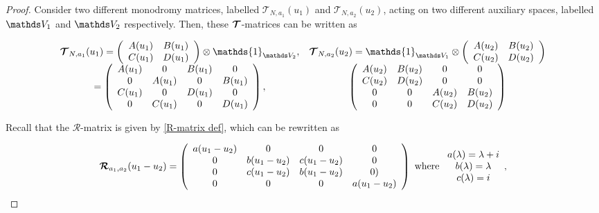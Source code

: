\documentclass{homework}
\begin{document}
\begin{proof}
Consider two different monodromy matrices, labelled $\bm{\mathcal{T}}_{N, a_1} (u_1)$ and  $\bm{\mathcal{T}}_{N, a_2} (u_2)$, acting on two different auxiliary spaces, labelled $\vds_1$ and $\vds_2$ respectively. Then, these $\bm{\mathcal{T}}$-matrices can be written as 

\begin{equation} \begin{array}{cc}
   \bm{\mathcal{T}}_{N, a_1} (u_1) = \left( \begin{array}{cc}
        A(u_1) & B(u_1)  \\
        C(u_1) & D(u_1) 
    \end{array} \right) \otimes \mathds{1}_{\vds_2}, & \bm{\mathcal{T}}_{N, a_2} (u_2) = \mathds{1}_{\vds_1} \otimes \left( \begin{array}{cc}
        A(u_2) & B(u_2)  \\
        C(u_2) & D(u_2) 
    \end{array} \right) \\
    = \left( \begin{array}{cccc}
        A(u_1) & 0 & B(u_1) & 0  \\
        0 & A(u_1) & 0 & B(u_1) \\
        C(u_1) & 0 & D(u_1) & 0  \\
        0 & C(u_1) & 0 & D(u_1) \\
    \end{array} \right), & \left( \begin{array}{cccc}
        A(u_2) & B(u_2) & 0 & 0  \\
        C(u_2) & D(u_2) & 0 & 0 \\
        0 & 0 & A(u_2) & B(u_2) \\
        0 & 0 & C(u_2) & D(u_2) \\
    \end{array} \right)
\end{array}
\end{equation}

 Recall that the $\bm{\mathcal{R}}$-matrix is given by \eqref{R-matrix def}, which can be rewritten as 

$$
\bm{\mathcal{R}}_{a_1, a_2}(u_1-u_2) = 
\left(\begin{array}{cccc}
        a (u_1-u_2) & 0 & 0 & 0  \\
        0 & b(u_1-u_2) & c(u_1-u_2) & 0  \\
        0 & c(u_1-u_2) & b(u_1-u_2) & 0 ) \\
        0 & 0 & 0 & a (u_1-u_2) \\
    \end{array} \right) \textnormal{ where } \begin{array}{c}
         a(\lambda) = \lambda + i  \\
         b(\lambda) = \lambda \\
         c(\lambda) = i 
    \end{array}, 
$$


\end{proof}
\end{document}
